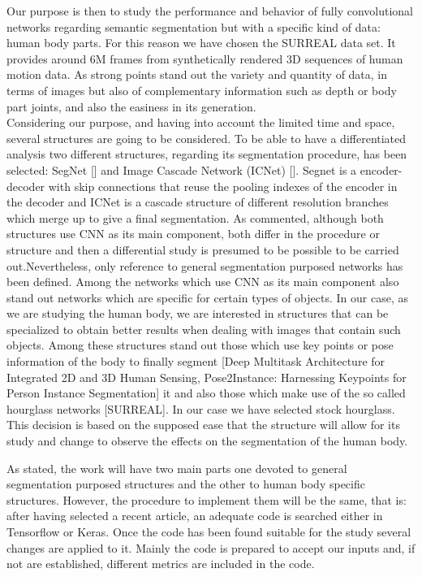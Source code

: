 \documentclass[12pt,a4paper]{article}
\begin{document}
Our purpose is then to study the performance and behavior of fully convolutional networks regarding semantic segmentation but with a specific kind of data: human body parts. For this reason we have chosen the SURREAL data set. It provides around 6M frames from synthetically rendered 3D sequences of human motion data. As strong points stand out the variety and quantity of data, in terms of images but also of complementary information such as depth or body part joints, and also the easiness in its generation.\\

Considering our purpose, and having into account the limited time and space, several structures are going to be considered. To be able to have a differentiated analysis two different structures, regarding its segmentation procedure, has been selected: SegNet [] and Image Cascade Network (ICNet) []. Segnet is a encoder-decoder with skip connections that reuse the pooling indexes of the encoder in the decoder and ICNet is a cascade structure of different resolution branches which merge up to give a final segmentation. As commented, although both structures use CNN as its main component, both differ in the procedure or structure and then a differential study is presumed to be possible to be carried out.Nevertheless, only reference to general segmentation purposed networks has been defined. Among the networks which use CNN as its main component also stand out networks which are specific for certain types of objects. In our case, as we are studying the human body, we are interested in structures that can be specialized to obtain better results when dealing with images that contain such objects. Among these structures  stand out those which use key points or pose information of the body to finally segment [Deep Multitask Architecture for Integrated 2D and 3D Human Sensing, Pose2Instance: Harnessing Keypoints for Person Instance Segmentation] it and also those which make use of the so called hourglass networks [SURREAL]. In our case we have selected stock hourglass. This decision is based on the supposed ease that the structure will allow for its study and change to observe the effects on the segmentation of the human body.\newline

As stated, the work will have two main parts one devoted to general segmentation purposed structures and the other to human body specific structures. However, the procedure to implement them will be the same, that is: after having selected a recent article, an adequate code is searched either in Tensorflow or Keras. Once the code has been found suitable for the study several changes are applied to it. Mainly the code is prepared to accept our inputs and, if not are established, different metrics are included in the code.\newline
\end{document}
